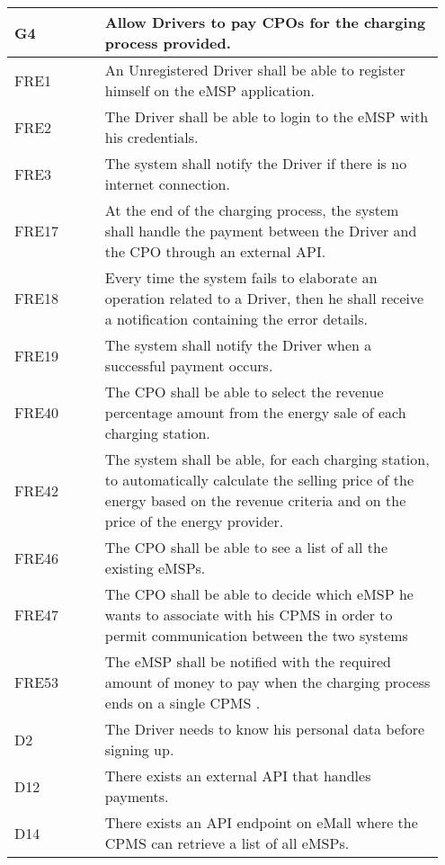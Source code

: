 {\renewcommand{\arraystretch}{1.5}
\begin{longtable}{|p{0.20\linewidth}p{0.75\linewidth} |}
    \hline
    \rowcolor{bluepoli!40}\textbf{G4} & \textbf{Allow Drivers to pay CPOs for the charging process provided.} \\
    \hline
    \rowcolor{bluepoli!15} FRE1 & An Unregistered Driver shall be able to register himself on the eMSP application. \\
    \hline
    \rowcolor{bluepoli!15} FRE2 & The Driver shall be able to login to the eMSP with his credentials. \\
    \hline 
    \rowcolor{bluepoli!15} FRE3 & The system shall notify the Driver if there is no internet connection. \\
    \hline 
    \rowcolor{bluepoli!15} FRE17 & At the end of the charging process, the system shall handle the payment between the Driver and the CPO through an external API. \\
    \hline
    \rowcolor{bluepoli!15} FRE18 & Every time the system fails to elaborate an operation related to a Driver, then he shall receive a notification containing the error details. \\
    \hline
    \rowcolor{bluepoli!15} FRE19 & The system shall notify the Driver when a successful payment occurs. \\
    \hline
    \rowcolor{bluepoli!15} FRE40& The CPO shall be able to select the revenue percentage amount from the energy sale of each charging station. \\
    
    \hline
    \rowcolor{bluepoli!15} FRE42 & The system shall be able, for each charging station, to automatically calculate the selling price of the energy based on the revenue criteria and on the price of the energy provider. \\
    \hline
    \rowcolor{bluepoli!15}
    FRE46 & The CPO shall be able to see a list of all the existing eMSPs. \\
    \hline
    \rowcolor{bluepoli!15} FRE47 &  The CPO shall be able to decide which eMSP he wants to associate with his CPMS in order to permit communication between the two systems \\
    \hline
    \rowcolor{bluepoli!15} FRE53 &  The eMSP shall be notified with the required amount of money to pay when the charging process ends on a single CPMS .\\
    \hline
    \rowcolor{bluepoli!5} D2 & The Driver needs to know his personal data before signing up. \\
    \hline 
    \rowcolor{bluepoli!5} D12& 
    There exists an external API that handles payments. \\
    \hline
    \rowcolor{bluepoli!5} D14 & There exists an API endpoint on eMall where the CPMS can retrieve a list of all eMSPs. \\
    \hline  
\end{longtable}}
